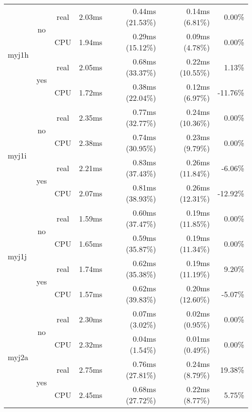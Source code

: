 \documentclass[en]{pracamgr}
\begin{document}
\begin{small}
\begin{longtable}{|l|c|c|r|r|r|r|}
\hline
\multirow{4}{*}{myj1h}    & \multirow{2}{*}{no}  & real & 2.03ms & 0.44ms (21.53\%) & 0.14ms (6.81\%) & 0.00\% \\*
                          &                      & CPU  & 1.94ms & 0.29ms (15.12\%) & 0.09ms (4.78\%) & 0.00\% \\*
                          \cline{2-7}
                          & \multirow{2}{*}{yes} & real & 2.05ms & 0.68ms (33.37\%) & 0.22ms (10.55\%) & 1.13\% \\*
                          &                      & CPU  & 1.72ms & 0.38ms (22.04\%) & 0.12ms (6.97\%) & -11.76\% \\
\hline
\multirow{4}{*}{myj1i}    & \multirow{2}{*}{no}  & real & 2.35ms & 0.77ms (32.77\%) & 0.24ms (10.36\%) & 0.00\% \\*
                          &                      & CPU  & 2.38ms & 0.74ms (30.95\%) & 0.23ms (9.79\%) & 0.00\% \\*
                          \cline{2-7}
                          & \multirow{2}{*}{yes} & real & 2.21ms & 0.83ms (37.43\%) & 0.26ms (11.84\%) & -6.06\% \\*
                          &                      & CPU  & 2.07ms & 0.81ms (38.93\%) & 0.26ms (12.31\%) & -12.92\% \\
\hline
\multirow{4}{*}{myj1j}    & \multirow{2}{*}{no}  & real & 1.59ms & 0.60ms (37.47\%) & 0.19ms (11.85\%) & 0.00\% \\*
                          &                      & CPU  & 1.65ms & 0.59ms (35.87\%) & 0.19ms (11.34\%) & 0.00\% \\*
                          \cline{2-7}
                          & \multirow{2}{*}{yes} & real & 1.74ms & 0.62ms (35.38\%) & 0.19ms (11.19\%) & 9.20\% \\*
                          &                      & CPU  & 1.57ms & 0.62ms (39.83\%) & 0.20ms (12.60\%) & -5.07\% \\
\hline
\multirow{4}{*}{myj2a}    & \multirow{2}{*}{no}  & real & 2.30ms & 0.07ms (3.02\%) & 0.02ms (0.95\%) & 0.00\% \\*
                          &                      & CPU  & 2.32ms & 0.04ms (1.54\%) & 0.01ms (0.49\%) & 0.00\% \\*
                          \cline{2-7}
                          & \multirow{2}{*}{yes} & real & 2.75ms & 0.76ms (27.81\%) & 0.24ms (8.79\%) & 19.38\% \\*
                          &                      & CPU  & 2.45ms & 0.68ms (27.72\%) & 0.22ms (8.77\%) & 5.75\% \\

\end{longtable}
\end{small}
\end{document}
